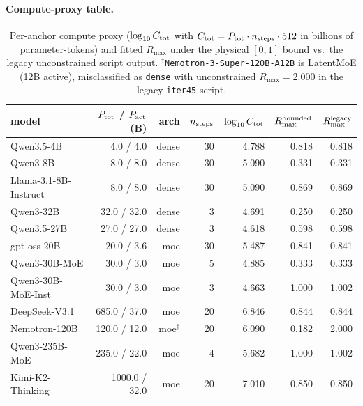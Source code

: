 \paragraph{Compute-proxy table.}
\begin{table}[ht]
\centering\small
\begin{tabular}{lrrrrrr}
\toprule
model & $P_{\rm tot}$ / $P_{\rm act}$ (B) & arch & $n_{\rm steps}$ & $\log_{10}C_{\rm tot}$ & $R_{\max}^{\rm bounded}$ & $R_{\max}^{\rm legacy}$ \\
\midrule
 Qwen3.5-4B & 4.0 / 4.0 & dense & 30 & 4.788 & 0.818 & 0.818 \\
 Qwen3-8B & 8.0 / 8.0 & dense & 30 & 5.090 & 0.331 & 0.331 \\
 Llama-3.1-8B-Instruct & 8.0 / 8.0 & dense & 30 & 5.090 & 0.869 & 0.869 \\
 Qwen3-32B & 32.0 / 32.0 & dense & 3 & 4.691 & 0.250 & 0.250 \\
 Qwen3.5-27B & 27.0 / 27.0 & dense & 3 & 4.618 & 0.598 & 0.598 \\
 gpt-oss-20B & 20.0 / 3.6 & moe & 30 & 5.487 & 0.841 & 0.841 \\
 Qwen3-30B-MoE & 30.0 / 3.0 & moe & 5 & 4.885 & 0.333 & 0.333 \\
 Qwen3-30B-MoE-Inst & 30.0 / 3.0 & moe & 3 & 4.663 & 1.000 & 1.002 \\
 DeepSeek-V3.1 & 685.0 / 37.0 & moe & 20 & 6.846 & 0.844 & 0.844 \\
 Nemotron-120B & 120.0 / 12.0 & moe$^{\dagger}$ & 20 & 6.090 & 0.182 & 2.000 \\
 Qwen3-235B-MoE & 235.0 / 22.0 & moe & 4 & 5.682 & 1.000 & 1.002 \\
 Kimi-K2-Thinking & 1000.0 / 32.0 & moe & 20 & 7.010 & 0.850 & 0.850 \\
\bottomrule
\end{tabular}
\caption{Per-anchor compute proxy ($\log_{10} C_{\rm tot}$ with $C_{\rm tot} = P_{\rm tot} \cdot n_{\rm steps} \cdot 512$ in billions of parameter-tokens) and fitted $R_{\max}$ under the physical $[0,1]$ bound vs.\ the legacy unconstrained script output. $^{\dagger}$\texttt{Nemotron-3-Super-120B-A12B} is LatentMoE (12B active), misclassified as \texttt{dense} with unconstrained $R_{\max}=2.000$ in the legacy \texttt{iter45} script.}
\label{tab:iter45-compute}
\end{table}
